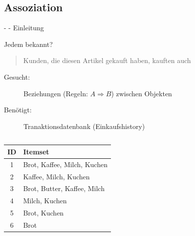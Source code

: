 \documentclass[fleqn,11pt,aspectratio=43]{beamer}
\begin{document}
%
%

\subsection{Assoziation~}


\begin{frame}{\insertsectionhead - \insertsubsectionhead - Einleitung \cite{ester2000knowledge}}

\begin{alertblock}{Jedem bekannt?}
\begin{quote}
Kunden, die diesen Artikel gekauft haben, kauften auch
\end{quote}
\end{alertblock}
\pause
\begin{description}
\item[Gesucht:] Beziehungen (Regeln: $A \Rightarrow B$) zwischen Objekten
\item[Benötigt:] Tranaktionsdatenbank (Einkaufshistory)
\end{description}
\begin{columns}[onlytextwidth]
 \small
    \begin{table}
    	    \hspace{-2em}\begin{tabular}{c|l}
    	    ID & Itemset\\ \hline
    	    1 & Brot, Kaffee, Milch, Kuchen\\
    	    2 & Kaffee, Milch, Kuchen\\
    	    3 & Brot, Butter, Kaffee, Milch\\
    	    4 & Milch, Kuchen\\
    	    5 & Brot, Kuchen\\
    	    6 & Brot
    	    \end{tabular}
    	    \end{table}
    	    

\end{columns}
\end{frame}
\end{document}
